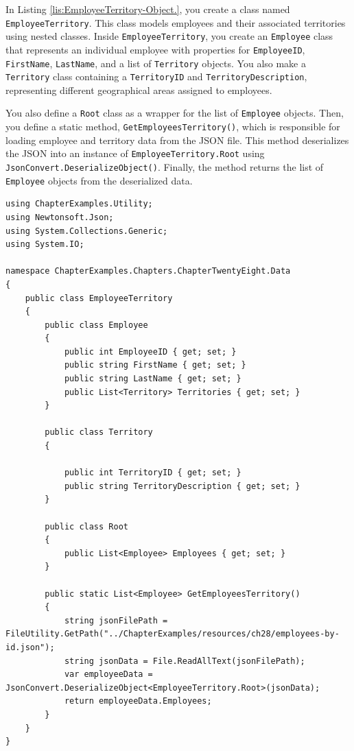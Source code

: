 \documentclass[american]{tufte-book}
\numberwithin{equation}{section}
\numberwithin{figure}{section}
\begin{document}
{{In Listing \ref{lis:EmployeeTerritory-Object.}, you create a class
named \texttt{EmployeeTerritory}. This class models employees and
their associated territories using nested classes. Inside \texttt{EmployeeTerritory},
you create an \texttt{Employee} class that represents an individual
employee with properties for \texttt{EmployeeID}, \texttt{FirstName},
\texttt{LastName}, and a list of \texttt{Territory} objects. You also
make a \texttt{Territory} class containing a \texttt{TerritoryID}
and \texttt{TerritoryDescription}, representing different geographical
areas assigned to employees.

You also define a \texttt{Root} class as a wrapper for the list of
\texttt{Employee} objects. Then, you define a static method, \texttt{GetEmployeesTerritory()},
which is responsible for loading employee and territory data from
the JSON file. This method deserializes the JSON into an instance
of \texttt{EmployeeTerritory.Root} using \texttt{JsonConvert.DeserializeObject()}.
Finally, the method returns the list of \texttt{Employee} objects
from the deserialized data.

\bgroup{}
\begin{lstlisting}[caption={EmployeeTerritory Object.},label={lis:EmployeeTerritory-Object.},basicstyle={\footnotesize\ttfamily},breaklines=true]
using ChapterExamples.Utility;
using Newtonsoft.Json;
using System.Collections.Generic;
using System.IO;

namespace ChapterExamples.Chapters.ChapterTwentyEight.Data
{
    public class EmployeeTerritory
    {
        public class Employee
        {
            public int EmployeeID { get; set; }
            public string FirstName { get; set; }
            public string LastName { get; set; }
            public List<Territory> Territories { get; set; }
        }

        public class Territory
        {

            public int TerritoryID { get; set; }
            public string TerritoryDescription { get; set; }       
        }

        public class Root
        {
            public List<Employee> Employees { get; set; }
        }

        public static List<Employee> GetEmployeesTerritory()
        {
            string jsonFilePath = FileUtility.GetPath("../ChapterExamples/resources/ch28/employees-by-id.json");
            string jsonData = File.ReadAllText(jsonFilePath);
            var employeeData = JsonConvert.DeserializeObject<EmployeeTerritory.Root>(jsonData);
            return employeeData.Employees;
        }
    }
}
\end{lstlisting}
\leavevmode\egroup

}}
\end{document}
